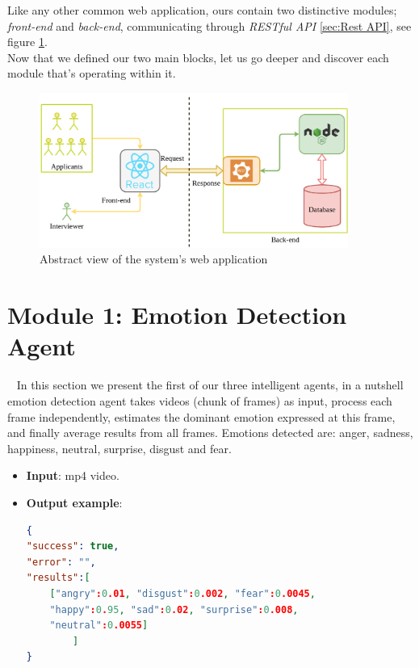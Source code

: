 Like any other common web application, ours contain two distinctive modules; \emph{front-end} and \emph{back-end}, communicating through \emph{RESTful API} \ref{sec:Rest API}, see figure \ref{fig:sys_3}. \\

Now that we defined our two main blocks, let us go deeper and discover each module that's operating within it.

\begin{figure}[h!]
\centering
\includegraphics[width=0.9\textwidth, frame]{images/sys_3.png}
\caption{Abstract view of the system's web application}
\label{fig:sys_3}
\end{figure}
\clearpage




\newpage
\section{Module 1: Emotion Detection Agent}\
\label{sec:module_1}
In this section we present the first of our three intelligent agents, in a nutshell emotion detection agent takes videos (chunk of frames) as input, process each frame independently, estimates the dominant emotion expressed at this frame, and finally average results from all frames. Emotions detected are: anger, sadness, happiness, neutral, surprise, disgust and fear.

\begin{itemize}
     
\item \textbf{Input}: mp4 video.

\item \textbf{Output example}:
\begin{lstlisting}[language=json,firstnumber=1]
{
"success": true,
"error": "",
"results":[
    ["angry":0.01, "disgust":0.002, "fear":0.0045, 
    "happy":0.95, "sad":0.02, "surprise":0.008, 
    "neutral":0.0055]
        ]
}
\end{lstlisting}
\end{itemize}

